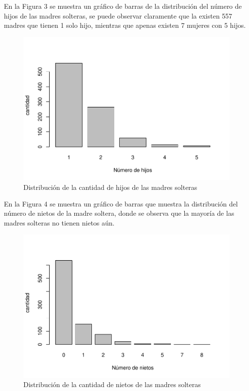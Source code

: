 \documentclass[11pt,twoside]{article}
\begin{document}
\vspace{120px}
\noindent
En la Figura 3 se muestra un gráfico de barras de la distribución del número de hijos de las madres solteras, se puede observar claramente que la existen 557 madres que tienen 1 solo hijo, mientras que apenas existen 7 mujeres con 5 hijos.  
\begin{figure}[H]
	\centering
	\includegraphics{barrasnumerodehijos.pdf}
	\caption{Distribución de la cantidad de hijos de las madres solteras}
\end{figure}

\vspace{140px}
\noindent
En la Figura 4 se muestra un gráfico de barras que muestra la distribución del número de nietos de la madre soltera, donde se observa que la mayoría de las madres solteras no tienen nietos aún.
\begin{figure}[H]
	\centering
	\includegraphics{barrasnumerodenietos1.pdf}
	\caption{Distribución de la cantidad de nietos de las madres solteras}
\end{figure}
\end{document}
